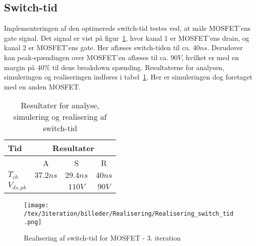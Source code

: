 

\subsection{Switch-tid}
Implementeringen af den optimerede switch-tid testes ved, at måle MOSFET'ens gate signal. Det signal er vist på figur~\ref{fig:realisering_switch_tid_3}, hvor kanal 1 er MOSFET'ens drain, og kanal 2 er MOSFET'ens gate. Her aflæses switch-tiden til ca. $40ns$. Derudover kan peak-spændingen over MOSFET'en aflæses til ca. $90V$, hvilket er med en margin på $40\percent$ til dens breakdown spænding. Resultaterne for analysen, simuleringen og realiseringen indføres i tabel~\ref{tab:resultat_switch_tid_3}. Her er simuleringen dog foretaget med en anden MOSFET.

\begin{table}[H] 			
	\centering
	\begin{tabularx}{\textwidth}{|X|c|c|c|}
		\hline
		\textbf{Tid} & \multicolumn{3}{|c|}{\textbf{Resultater}} 										\\ \hline
		& A & S & R 									\\ \hline
		$T_{ch}$    & $37.2ns$ & $29.4ns$ & $40ns$ 											\\ \hline 
		$V_{ds,pk}$ &          & $110V$   & $90V$		\\ \hline 
		
	\end{tabularx}
	\caption{Resultater for analyse, simulering og realisering af switch-tid}
	\label{tab:resultat_switch_tid_3}
\end{table}

\begin{figure}[H]
	\center
	\texttt{[image: /tex/3iteration/billeder/Realisering/Realisering\_switch\_tid.png]}
	\caption{Realisering af switch-tid for MOSFET - 3. iteration}
	\label{fig:realisering_switch_tid_3}
\end{figure}